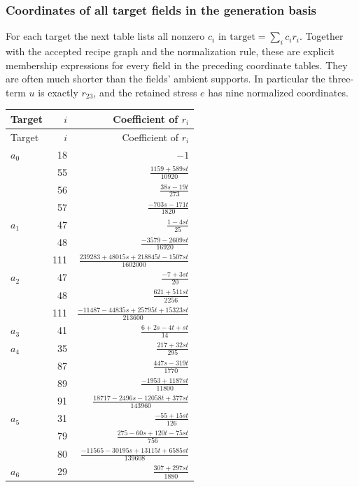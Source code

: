 \subsubsection{Coordinates of all target fields in the generation basis}

For each target the next table lists all nonzero $c_i$ in
$\text{target}=\sum_i c_ir_i$. Together with the accepted recipe graph
and the normalization rule, these are explicit membership expressions
for every field in the preceding coordinate tables. They are often
much shorter than the fields' ambient supports. In particular the
three-term $u$ is exactly $r_{23}$, and the retained stress $e$ has
nine normalized coordinates.

\begingroup\small\renewcommand{\arraystretch}{1.4}
\begin{longtable}{@{}lrr@{}}
\toprule Target&$i$&Coefficient of $r_i$\\\midrule\endfirsthead
\toprule Target&$i$&Coefficient of $r_i$\\\midrule\endhead
\bottomrule\endfoot
$a_{0}$ & 18 & $-1$\\
 & 55 & $\frac{1159+589st}{10920}$\\
 & 56 & $\frac{38s-19t}{273}$\\
 & 57 & $\frac{-703s-171t}{1820}$\\
$a_{1}$ & 47 & $\frac{1-4st}{25}$\\
 & 48 & $\frac{-3579-2609st}{16920}$\\
 & 111 & $\frac{239283+48015s+218845t-1507st}{1602000}$\\
$a_{2}$ & 47 & $\frac{-7+3st}{20}$\\
 & 48 & $\frac{621+511st}{2256}$\\
 & 111 & $\frac{-11487-44835s+25795t+15323st}{213600}$\\
$a_{3}$ & 41 & $\frac{6+2s-4t+st}{14}$\\
$a_{4}$ & 35 & $\frac{217+32st}{295}$\\
 & 87 & $\frac{447s-319t}{1770}$\\
 & 89 & $\frac{-1953+1187st}{11800}$\\
 & 91 & $\frac{18717-2496s-12058t+377st}{143960}$\\
$a_{5}$ & 31 & $\frac{-55+15st}{126}$\\
 & 79 & $\frac{275-60s+120t-75st}{756}$\\
 & 80 & $\frac{-11565-30195s+13115t+6585st}{139608}$\\
$a_{6}$ & 29 & $\frac{307+297st}{1880}$\\

\end{longtable}
